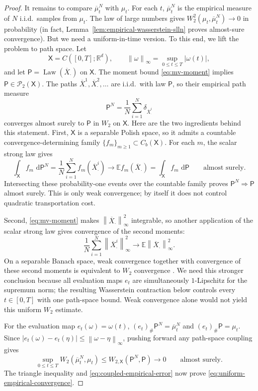 \documentclass[11pt]{amsart}
\numberwithin{equation}{section}
\theoremstyle{plain}
\newcommand{\R}{\mathbb{R}}
\newcommand{\E}{\mathbb{E}}
\newcommand{\cP}{\mathcal{P}}
\newcommand{\dd}{\,\mathrm{d}}
\newcommand{\abs}[1]{\left\lvert#1\right\rvert}
\newcommand{\norm}[1]{\left\lVert#1\right\rVert}
\DeclareMathOperator{\Law}{Law}
\begin{document}
\begin{proof}
It remains to compare $\overline\mu_t^N$ with $\mu_t$.  For each $t$, $\overline\mu_t^N$ is the empirical measure of $N$ i.i.d.\ samples from $\mu_t$.  The law of large numbers gives $W_2^2(\mu_t,\overline\mu_t^N)\to 0$ in probability (in fact, Lemma~\ref{lem:empirical-wasserstein-slln} proves almost-sure convergence). But we need a uniform-in-time version.  To this end, we lift the problem to path space.
  Let
\[
 \mathsf X=C([0,T];\R^d),\qquad
 \norm{\omega}_\infty=\sup_{0\leq t\leq T}\abs{\omega(t)},
\]
and let $\mathsf P=\Law(\overline X_{\cdot})$ on $\mathsf X$.  The moment bound
\eqref{eq:mv-moment} implies $\mathsf P\in\cP_2(\mathsf X)$.  The paths
$\overline X_{\cdot}^1,\overline X_{\cdot}^2,\ldots$ are i.i.d.\ with law
$\mathsf P$, so their empirical path measure
\[
 \mathsf P^N=\frac1N\sum_{i=1}^N
 \delta_{\overline X_{\cdot}^i}
\]
converges almost surely to $\mathsf P$ in $W_2$ on $\mathsf X$.  Here are the
two ingredients behind this statement.  First, $\mathsf X$ is a separable
Polish space, so it admits a countable convergence-determining family
$\{f_m\}_{m\geq1}\subset C_b(\mathsf X)$.  For each $m$, the scalar strong law
gives
\[
 \int_{\mathsf X}f_m\,\dd\mathsf P^N
 =\frac1N\sum_{i=1}^Nf_m(\overline X_{\cdot}^i)
 \longrightarrow\E f_m(\overline X_{\cdot})
 =\int_{\mathsf X}f_m\,\dd\mathsf P
 \qquad\text{almost surely}.
\]
Intersecting these probability-one events over the countable family proves
$\mathsf P^N\Rightarrow\mathsf P$ almost surely.  This is only weak
convergence; by itself it does not control quadratic transportation cost.

Second, \eqref{eq:mv-moment} makes
$\norm{\overline X_{\cdot}}_\infty^2$ integrable, so another application of
the scalar strong law gives convergence of the second moments:
\[
 \frac1N\sum_{i=1}^N\norm{\overline X_{\cdot}^i}_\infty^2
 \longrightarrow
 \E\norm{\overline X_{\cdot}}_\infty^2.
\]
On a separable Banach space, weak convergence together with convergence of
these second moments is equivalent to $W_2$ convergence
\cite[Theorem~6.9]{Villani2009}.  We need this stronger conclusion because all
evaluation maps $e_t$ are simultaneously $1$-Lipschitz for the supremum norm;
the resulting Wasserstein contraction below controls every $t\in[0,T]$ with
one path-space bound.  Weak convergence alone would not yield this uniform
$W_2$ estimate.

For the evaluation map $e_t(\omega)=\omega(t)$,
$(e_t)_\#\mathsf P^N=\overline\mu_t^N$ and
$(e_t)_\#\mathsf P=\mu_t$.  Since
$\abs{e_t(\omega)-e_t(\eta)}\leq\norm{\omega-\eta}_\infty$, pushing forward
any path-space coupling gives
\[
 \sup_{0\leq t\leq T}W_2(\overline\mu_t^N,\mu_t)
 \leq W_{2,\mathsf X}(\mathsf P^N,\mathsf P)
 \longrightarrow0
 \qquad\text{almost surely}.
\]
The triangle inequality and \eqref{eq:coupled-empirical-error} now prove
\eqref{eq:uniform-empirical-convergence}.


\end{proof}
\end{document}
